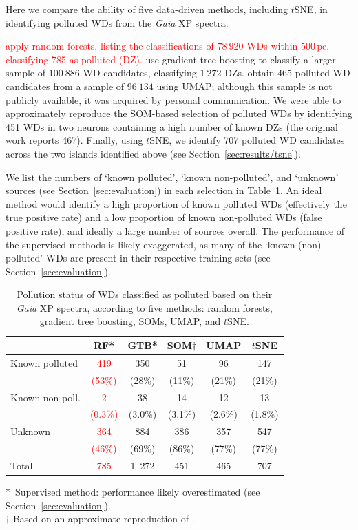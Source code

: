 \documentclass[fleqn,usenatbib]{rasti}
\newcommand{\red}[1]{\textcolor{red}{#1}}
\begin{document}
Here we compare the ability of five data-driven methods, including $t$SNE, in identifying polluted WDs from the \textit{Gaia} XP spectra.

\red{\citet{garciazamora25} apply random forests, listing the classifications of $78~920$ WDs within $500\,\text{pc}$, classifying 785 as polluted (DZ).}
\citet{vincent24} use gradient tree boosting to classify a larger sample of $100~886$ WD candidates, classifying $1~272$ DZs.
\citet{kao24} obtain $465$ polluted WD candidates from a sample of $96~134$ using UMAP; although this sample is not publicly available, it was acquired by personal communication.
We were able to approximately reproduce the SOM-based selection of polluted WDs by \citet{perezcouto24} identifying 451 WDs in two neurons containing a high number of known DZs (the original work reports 467).
Finally, using $t$SNE, we identify 707 polluted WD candidates across the two islands identified above (see Section~\ref{sec:results/tsne}).

We list the numbers of `known polluted', `known non-polluted', and `unknown' sources (see Section~\ref{sec:evaluation}) in each selection in Table~\ref{tab:evaluation}.
An ideal method would identify a high proportion of known polluted WDs (effectively the true positive rate) and a low proportion of known non-polluted WDs (false positive rate), and ideally a large number of sources overall.
The performance of the supervised methods is likely exaggerated, as many of the `known (non)-polluted' WDs are present in their respective training sets (see Section~\ref{sec:evaluation}).

\begin{table}
\caption{
    Pollution status of WDs classified as polluted based on their \textit{Gaia} XP spectra, according to five methods: random forests, gradient tree boosting, SOMs, UMAP, and $t$SNE.
}
\label{tab:evaluation}
 
\begin{tabular}{lccccc}
    \hline
    & RF* & GTB* & SOM$\dagger$ & UMAP & $t$SNE \\
    \hline
    Known polluted & \red{419} & 350 & 51 & 96 & 147\\
    & \red{(53\%)} & (28\%) & (11\%) & (21\%) & (21\%) \\
    Known non-poll. & \red{2} & 38 & 14 & 12 & 13 \\
    & \red{(0.3\%)} & (3.0\%) & (3.1\%) & (2.6\%) & (1.8\%) \\
    Unknown & \red{364} & 884 & 386 & 357 & 547 \\
    & \red{(46\%)} & (69\%) & (86\%) & (77\%) & (77\%) \\
    Total & \red{785} & 1~272 & 451 & 465 & 707 \\
    \hline
 \end{tabular}
*~Supervised method: performance likely overestimated (see Section~\ref{sec:evaluation}).\\
$\dagger$ Based on an approximate reproduction of \citet{perezcouto24}.
\end{table}
\end{document}
